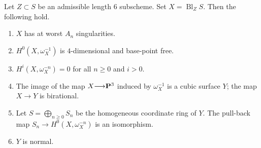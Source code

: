 \documentclass[12pt,reqno]{amsart}
\DeclareMathOperator{\Bl}{Bl}
\renewcommand{\to}{{\longrightarrow}}
\numberwithin{equation}{section}
\begin{document}
\begin{proposition}
  \label{prop:admissibleblowup}
Let $Z \subset S$ be an admissible length 6 subscheme.
Set $X = \Bl_ZS$.
Then the following hold.
\begin{enumerate}
\item $X$ has at worst $A_n$ singularities.
\item $H^0\left(X, \omega^{-1}_X\right)$ is $4$-dimensional and base-point free.
\item $H^i(X,\omega_X^{-n}) = 0$ for all $n \geq 0$ and $i > 0$.
\item The image of the map $X \to \P^3$ induced by $\omega_X^{-1}$ is a cubic surface $Y$; the map $X \to Y$ is birational.
\item Let $S = \bigoplus_{n \geq 0} S_n$ be the homogeneous coordinate ring of $Y$.
  The pull-back map $S_n \to H^0\left(X, \omega_X^{-n}\right)$ is an isomorphism.
\item $Y$ is normal.
\end{enumerate}
\end{proposition}
\end{document}
